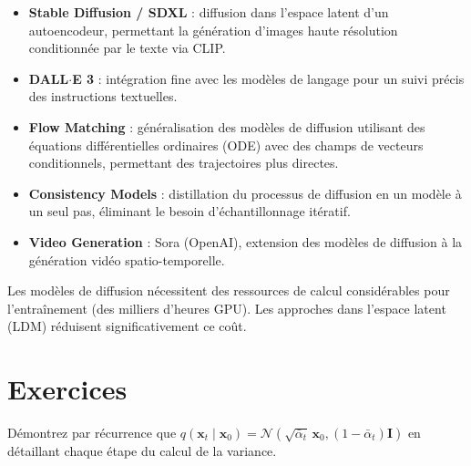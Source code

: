 \begin{sota}[title=\textbf{Mod\`eles de diffusion en 2024--2025}]
\begin{itemize}
    \item \textbf{Stable Diffusion / SDXL} : diffusion dans l'espace latent
          d'un autoencodeur, permettant la g\'en\'eration d'images haute r\'esolution
          conditionn\'ee par le texte via CLIP.
    \item \textbf{DALL$\cdot$E 3} : int\'egration fine avec les mod\`eles de langage
          pour un suivi pr\'ecis des instructions textuelles.
    \item \textbf{Flow Matching} : g\'en\'eralisation des mod\`eles
          de diffusion utilisant des \'equations diff\'erentielles ordinaires (ODE)
          avec des champs de vecteurs conditionnels, permettant des trajectoires
          plus directes.
    \item \textbf{Consistency Models} : distillation
          du processus de diffusion en un mod\`ele \`a un seul pas, \'eliminant
          le besoin d'\'echantillonnage it\'eratif.
    \item \textbf{Video Generation} : Sora (OpenAI), extension des mod\`eles
          de diffusion \`a la g\'en\'eration vid\'eo spatio-temporelle.
\end{itemize}
\end{sota}

\begin{attention}
Les mod\`eles de diffusion n\'ecessitent des ressources de calcul consid\'erables
pour l'entra\^inement (des milliers d'heures GPU). Les approches dans l'espace
latent (LDM) r\'eduisent significativement ce co\^ut.
\end{attention}

\section{Exercices}
\label{sec:diffusion-exercices}

\begin{exercice}
\label{exo:closed-form}
D\'emontrez par r\'ecurrence que $q(\mathbf{x}_t \mid \mathbf{x}_0) = \mathcal{N}(\sqrt{\bar{\alpha}_t}\,\mathbf{x}_0, (1 - \bar{\alpha}_t)\mathbf{I})$
en d\'etaillant chaque \'etape du calcul de la variance.
\end{exercice}


